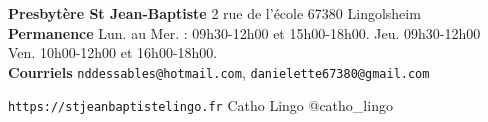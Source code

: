 \begin{framed}
\textbf{Presbytère St Jean-Baptiste}
2 rue de l'école 67380 Lingolsheim  \\
\textbf{Permanence} Lun. au Mer. : 09h30-12h00 et 15h00-18h00. Jeu. 09h30-12h00 Ven. 10h00-12h00 et 16h00-18h00. \\
\textbf{Courriels} \texttt{nddessables@hotmail.com}, \texttt{danielette67380@gmail.com}


\texttt{https://stjeanbaptistelingo.fr} \hfill \faFacebook Catho Lingo \hfill \faInstagram @catho\_lingo
\end{framed}


